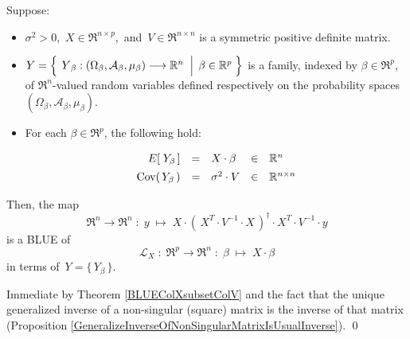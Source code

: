 
\vskip 1.0cm
\begin{corollary}
\mbox{}
\vskip 0.1cm
\noindent
Suppose:
\begin{itemize}
\item
	$\sigma^{2} > 0$,
	\,$X \in \Re^{n \times p}$,\,
	and
	\,$V \in \Re^{n \times n}$ is a symmetric {\color{red}positive definite} matrix.
\item
	$Y = \left\{\;
		\left.
		\overset{{\color{white}.}}{Y}_{\beta} : (\Omega_{\beta},\mathcal{A}_{\beta},\mu_{\beta}) \longrightarrow \Re^{n}
		\;\;\right\vert\;
		\beta \in \Re^{p}
		\;\right\}$
	is a family, indexed by $\beta \in \Re^{p}$,
	of $\Re^{n}$-valued random variables defined respectively on the
	probability spaces $(\Omega_{\beta},\mathcal{A}_{\beta},\mu_{\beta})$.
\item
	For each $\beta \in \Re^{p}$, the following hold:
	\begin{equation*}
	\begin{array}{rclcl}
	E\!\left[\;Y_{\beta}\,\right] &  \overset{{\color{white}\vert}}{=} & X \cdot \beta & \in & \Re^{n}
	\\
	\Cov\!\left(\,Y_{\beta}\,\right) & \overset{{\color{white}\vert}}{=} & \sigma^{2} \cdot V & \in & \Re^{n \times n}
	\end{array}
	\end{equation*}
\end{itemize}
Then, {\color{red}the map
\begin{equation*}
\Re^{n} \longrightarrow \Re^{n}
\; : \; y \; \longmapsto \;
X \cdot \left(\,X^{T} \cdot V^{-1} \cdot X\,\right)^{\dagger} \cdot X^{T} \cdot V^{-1} \cdot y
\end{equation*}
is a BLUE of
\begin{equation*}
\mathcal{L}_{X} \; : \; \Re^{p} \longrightarrow \Re^{n} \; : \; \beta \; \longmapsto \; X \cdot \beta
\end{equation*}
in terms of
\,$Y = \{\,Y_{\beta}\,\}$.}
\end{corollary}
\proof
Immediate by Theorem \ref{BLUEColXsubsetColV} and the fact that
the unique generalized inverse of a non-singular (square) matrix is the
inverse of that matrix (Proposition \ref{GeneralizeInverseOfNonSingularMatrixIsUsualInverse}).
\qed

